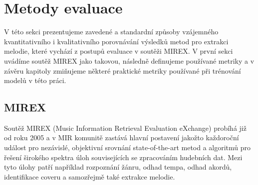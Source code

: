 \chapter{Metody evaluace}\label{cha:evaluace}

V této sekci prezentujeme zavedené a standardní způsoby vzájemného kvantitativního i kvalitativního porovnávání výsledků metod pro extrakci melodie, které vychází z postupů evaluace v soutěži MIREX. V první sekci uvádíme soutěž MIREX jako takovou, následně definujeme používané metriky a v závěru kapitoly zmiňujeme některé praktické metriky používané při trénování modelů v této práci.

\section{MIREX}

Soutěž MIREX (Music Information Retrieval Evaluation eXchange) probíhá již od roku 2005 a v MIR komunitě zastává hlavní postavení jakožto každoroční událost pro nezávislé, objektivní srovnání state-of-the-art metod a algoritmů pro řešení širokého spektra úloh souvisejících se zpracováním hudebních dat. Mezi tyto úlohy patří například rozpoznání žánru, odhad tempa, odhad akordů, identifikace coveru a samozřejmě také extrakce melodie.

